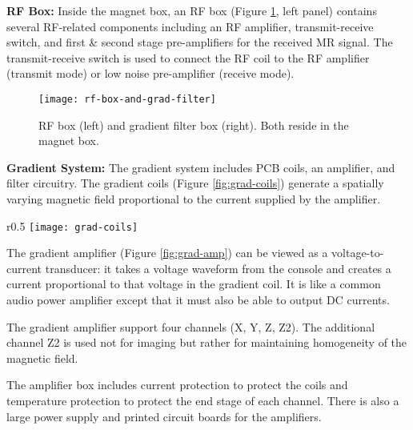 \vspace{5mm}

\noindent\textbf{RF Box:} Inside the magnet box, an RF box (Figure \ref{fig:rf-box-and-grad-filter}, left panel) contains several RF-related components including an RF amplifier, transmit-receive switch, and first \& second stage pre-amplifiers for the received MR signal.  The transmit-receive switch is used to connect the RF coil to the RF amplifier (transmit mode) or low noise pre-amplifier (receive mode).

 \begin{figure}[h]
    \centering
    \texttt{[image: rf-box-and-grad-filter]}
    \caption{\label{fig:rf-box-and-grad-filter} RF box (left) and gradient filter box (right). Both reside in the magnet box.}
    \vspace{-2mm}
\end{figure}

\vspace{5mm}

\noindent\textbf{Gradient System:} The gradient system includes PCB coils, an amplifier, and filter circuitry. The gradient coils (Figure \ref{fig:grad-coils}) generate a spatially varying magnetic field proportional to the current supplied by the amplifier.

\begin{wrapfigure}{r}{0.5\textwidth}%
    \centering
    \texttt{[image: grad-coils]}
    \caption{\label{fig:grad-coils} PCB gradient coils.}
\end{wrapfigure}

\vspace{5mm}

The gradient amplifier (Figure \ref{fig:grad-amp}) can be viewed as a voltage-to-current transducer: it takes a voltage waveform from the console and creates a current proportional to that voltage in the gradient coil. It is like a common audio power amplifier except that it must also be able to output DC currents.

The gradient amplifier support four channels (X, Y, Z, Z2). The additional channel Z2 is used not for imaging but rather for maintaining homogeneity of the magnetic field.

The amplifier box includes current protection to protect the coils and temperature protection to protect the end stage of each channel. There is also a large power supply and printed circuit boards for the amplifiers.

